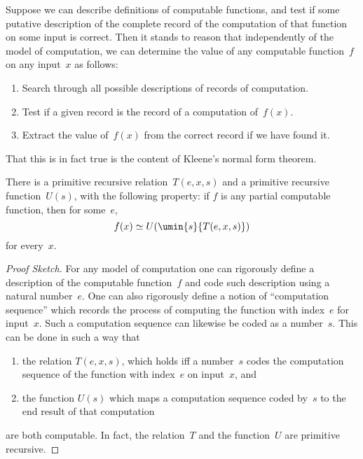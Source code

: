 \documentclass[../../../include/open-logic-section]{subfiles}
\begin{document}

Suppose we can describe definitions of computable functions, and test if
some putative description of the complete record of the computation of
that function on some input is correct. Then it stands to reason that
independently of the model of computation, we can determine the value
of any computable function~$f$ on any input~$x$ as follows:
\begin{enumerate}
  \item Search through all possible descriptions of records of
  computation.
  \item Test if a given record is the record of a computation of~$f(x)$.
  \item Extract the value of~$f(x)$ from the correct record if we have
  found it.
\end{enumerate}
That this is in fact true is the content of Kleene's normal form
theorem.

\begin{thm}
There is a primitive recursive relation~$T(e, x, s)$ and a primitive
recursive function~$U(s)$, with the following property: if $f$ is any
partial computable function, then for some~$e$,
\[
f(x) \simeq U(\umin{s}{T(e, x, s)})
\]
for every~$x$.
\end{thm}

\begin{proof}[Proof Sketch]
For any model of computation one can rigorously define a description
of the computable function~$f$ and code such description using a
natural number~$e$.  One can also rigorously define a notion of
``computation sequence'' which records the process of computing the
function with index~$e$ for input~$x$.  Such a computation sequence can
likewise be coded as a number~$s$.  This can be done in such a way
that
\begin{enumerate}
  \item the relation $T(e, x, s)$, which holds iff a number~$s$ codes the computation
  sequence of the function with index~$e$ on input~$x$, and
  \item the function $U(s)$ which maps a computation sequence coded
  by~$s$ to the end result of that computation
\end{enumerate}
are both computable. In fact, the relation~$T$ and the function~$U$
are primitive recursive.
\end{proof}
\end{document}

